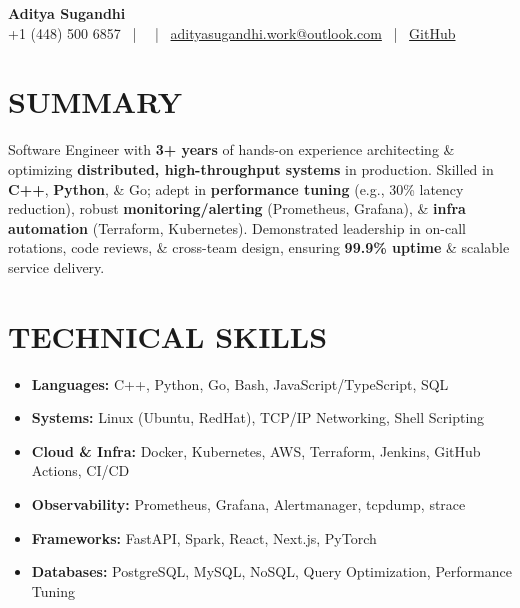 \documentclass[letterpaper,10pt]{article}
\begin{document}
\begin{center}
  {\huge \textbf{Aditya Sugandhi}} \\
  +1 (448) 500 6857 ~|~ \color{metablue}{Tallahassee, FL} ~|~
  \href{mailto:adityasugandhi.work@outlook.com}{adityasugandhi.work@outlook.com} ~|~
  \href{https://github.com/adityasugandhi}{GitHub}
  
\end{center}
\vspace{-12pt}

\section{\textcolor{metablue}{SUMMARY}}
\small
\vspace{-6pt}
Software Engineer with \textbf{3+ years} of hands-on experience architecting \& optimizing \textbf{distributed, high-throughput systems} in production. Skilled in \textbf{C++}, \textbf{Python}, \& Go; adept in \textbf{performance tuning} (e.g., 30\% latency reduction), robust \textbf{monitoring/alerting} (Prometheus, Grafana), \& \textbf{infra automation} (Terraform, Kubernetes). Demonstrated leadership in on-call rotations, code reviews, \& cross-team design, ensuring \textbf{99.9\% uptime} \& scalable service delivery.
\vspace{-5pt}

\section{\textcolor{metablue}{TECHNICAL SKILLS}}
\vspace{-5pt}
\small
\begin{itemize}[label={}]
  \item{\textbf{Languages:} C++, Python, Go, Bash, JavaScript/TypeScript, SQL}
  \item{\textbf{Systems:} Linux (Ubuntu, RedHat), TCP/IP Networking, Shell Scripting}
  \item{\textbf{Cloud & Infra:} Docker, Kubernetes, AWS, Terraform, Jenkins, GitHub Actions, CI/CD}
  \item{\textbf{Observability:} Prometheus, Grafana, Alertmanager, tcpdump, strace}
  \item{\textbf{Frameworks:} FastAPI, Spark, React, Next.js, PyTorch}
  \item{\textbf{Databases:} PostgreSQL, MySQL, NoSQL, Query Optimization, Performance Tuning}
\end{itemize}
\vspace{-10pt}
\end{document}
